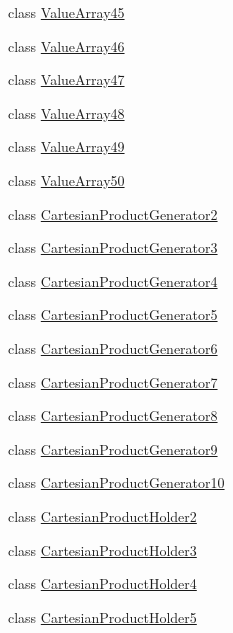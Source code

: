 \begin{DoxyCompactItemize}
class \hyperlink{classtesting_1_1internal_1_1ValueArray45}{\-Value\-Array45}
\item 
class \hyperlink{classtesting_1_1internal_1_1ValueArray46}{\-Value\-Array46}
\item 
class \hyperlink{classtesting_1_1internal_1_1ValueArray47}{\-Value\-Array47}
\item 
class \hyperlink{classtesting_1_1internal_1_1ValueArray48}{\-Value\-Array48}
\item 
class \hyperlink{classtesting_1_1internal_1_1ValueArray49}{\-Value\-Array49}
\item 
class \hyperlink{classtesting_1_1internal_1_1ValueArray50}{\-Value\-Array50}
\item 
class \hyperlink{classtesting_1_1internal_1_1CartesianProductGenerator2}{\-Cartesian\-Product\-Generator2}
\item 
class \hyperlink{classtesting_1_1internal_1_1CartesianProductGenerator3}{\-Cartesian\-Product\-Generator3}
\item 
class \hyperlink{classtesting_1_1internal_1_1CartesianProductGenerator4}{\-Cartesian\-Product\-Generator4}
\item 
class \hyperlink{classtesting_1_1internal_1_1CartesianProductGenerator5}{\-Cartesian\-Product\-Generator5}
\item 
class \hyperlink{classtesting_1_1internal_1_1CartesianProductGenerator6}{\-Cartesian\-Product\-Generator6}
\item 
class \hyperlink{classtesting_1_1internal_1_1CartesianProductGenerator7}{\-Cartesian\-Product\-Generator7}
\item 
class \hyperlink{classtesting_1_1internal_1_1CartesianProductGenerator8}{\-Cartesian\-Product\-Generator8}
\item 
class \hyperlink{classtesting_1_1internal_1_1CartesianProductGenerator9}{\-Cartesian\-Product\-Generator9}
\item 
class \hyperlink{classtesting_1_1internal_1_1CartesianProductGenerator10}{\-Cartesian\-Product\-Generator10}
\item 
class \hyperlink{classtesting_1_1internal_1_1CartesianProductHolder2}{\-Cartesian\-Product\-Holder2}
\item 
class \hyperlink{classtesting_1_1internal_1_1CartesianProductHolder3}{\-Cartesian\-Product\-Holder3}
\item 
class \hyperlink{classtesting_1_1internal_1_1CartesianProductHolder4}{\-Cartesian\-Product\-Holder4}
\item 
class \hyperlink{classtesting_1_1internal_1_1CartesianProductHolder5}{\-Cartesian\-Product\-Holder5}

\end{DoxyCompactItemize}
